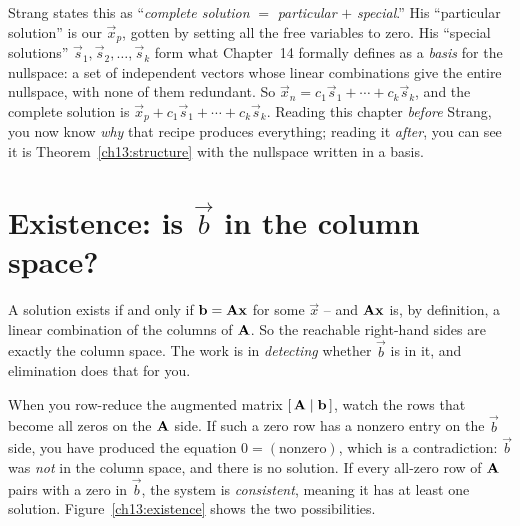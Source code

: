 \begin{strangbox}
Strang states this as ``\emph{complete solution} $=$ \emph{particular} $+$
\emph{special}.'' His ``particular solution'' is our $\vec{x}_p$, gotten by setting all the
free variables to zero. His ``special solutions'' $\vec{s}_1,\vec{s}_2,\dots,\vec{s}_k$
form what Chapter~14 formally defines as a \emph{basis} for the nullspace: a set of
independent vectors whose linear combinations give the entire nullspace, with none of
them redundant. So $\vec{x}_n=c_1\vec{s}_1+\cdots+c_k\vec{s}_k$, and the complete solution is
$\vec{x}_p+c_1\vec{s}_1+\cdots+c_k\vec{s}_k$. Reading this chapter \emph{before} Strang,
you now know \emph{why} that recipe produces everything; reading it \emph{after}, you can
see it is Theorem~\ref{ch13:structure} with the nullspace written in a basis.
\end{strangbox}

\section{Existence: is \texorpdfstring{$\vec b$}{b} in the column space?}

A solution exists if and only if $\mathbf{b}=\mathbf{A}\mathbf{x}$ for some $\vec{x}$ -- and
$\mathbf{A}\mathbf{x}$ is, by definition, a linear combination of the columns of $\mathbf{A}$. So
the reachable right-hand sides are exactly the column space. The work is in
\emph{detecting} whether $\vec{b}$ is in it, and elimination does that for you.

When you row-reduce the augmented matrix $[\,\mathbf{A}\mid\mathbf{b}\,]$, watch the rows that
become all zeros on the $\mathbf{A}$ side. If such a zero row has a nonzero entry on the
$\vec{b}$ side, you have produced the equation $0=(\text{nonzero})$, which is a
contradiction: $\vec{b}$ was \emph{not} in the column space, and there is no solution. If
every all-zero row of $\mathbf{A}$ pairs with a zero in $\vec{b}$, the system is
\emph{consistent}, meaning it has at least one solution. Figure~\ref{ch13:existence} shows
the two possibilities.

